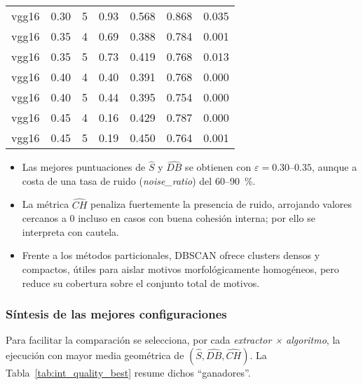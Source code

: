 \begin{longtable}{lrrrrrr}
      vgg16 & 0.30 &            5 &         0.93 &            0.568 &   0.868 &    0.035 \\
      vgg16 & 0.35 &            4 &         0.69 &            0.388 &   0.784 &    0.001 \\
      vgg16 & 0.35 &            5 &         0.73 &            0.419 &   0.768 &    0.013 \\
      vgg16 & 0.40 &            4 &         0.40 &            0.391 &   0.768 &    0.000 \\
      vgg16 & 0.40 &            5 &         0.44 &            0.395 &   0.754 &    0.000 \\
      vgg16 & 0.45 &            4 &         0.16 &            0.429 &   0.787 &    0.000 \\
      vgg16 & 0.45 &            5 &         0.19 &            0.450 &   0.764 &    0.001 \\
\end{longtable}

\begin{itemize}
  \item Las mejores puntuaciones de \(\widehat S\) y \(\widehat{DB}\) se obtienen con \(\varepsilon=0.30\)–\(0.35\), aunque a costa de una tasa de ruido (\textit{noise\_ratio}) del 60--90~\%.
  \item La métrica \(\widehat{CH}\) penaliza fuertemente la presencia de ruido, arrojando valores cercanos a \(0\) incluso en casos con buena cohesión interna; por ello se interpreta con cautela.
  \item Frente a los métodos particionales, DBSCAN ofrece clusters densos y compactos, útiles para aislar motivos morfológicamente homogéneos, pero reduce su cobertura sobre el conjunto total de motivos.
\end{itemize}

\subsubsection{Síntesis de las mejores configuraciones}

Para facilitar la comparación se selecciona, por cada
\textit{extractor × algoritmo}, la ejecución con mayor media geométrica de
\((\widehat S,\widehat{DB},\widehat{CH})\).
La Tabla~\ref{tab:int_quality_best} resume dichos “ganadores”.

